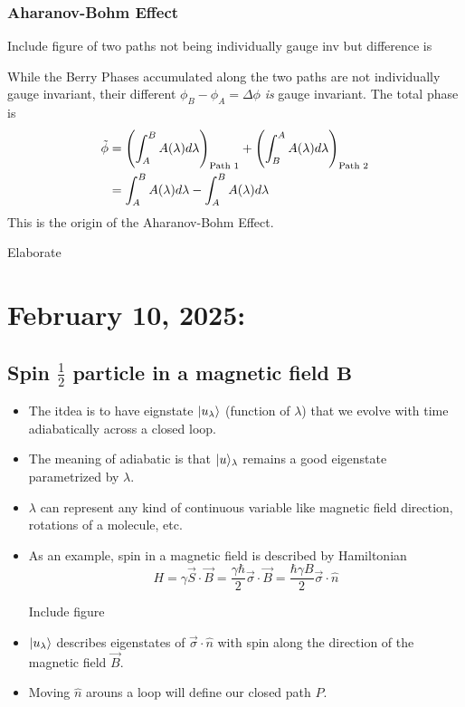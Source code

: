 \documentclass[11pt]{article}
\begin{document}
\subsubsection*{Aharanov-Bohm Effect}
\begin{center}
  Include figure of two paths not being individually gauge inv but difference is
\end{center} While the Berry Phases accumulated along the two paths are not individually gauge invariant, their different $\phi_B - \phi_A = \Delta \phi$ \emph{is} gauge invariant. The total phase is 
\begin{align*}
  \Tilde{\phi} &= \left(\int_{A}^B A(\lambda) d\lambda\right)_{\text{Path 1}} +  \left(\int_{B}^A A(\lambda) d\lambda\right)_{\text{Path 2}}  \\
  &= \int_{A}^B A(\lambda) d\lambda - \int_{A}^B A(\lambda) d\lambda
\end{align*} This is the origin of the Aharanov-Bohm Effect. \begin{note}
  {Elaborate}
\end{note}

\pagebreak
\section{February 10, 2025:}

\subsection{Spin $\frac{1}{2}$ particle in a magnetic field $\mathbf{B}$}

\begin{itemize}
  \item The itdea is to have eignstate $\lvert u_{\lambda}\rangle$ (function of $\lambda$) that we evolve with time adiabatically across a closed loop.
  \item The meaning of adiabatic is that $\lvert u\rangle_{\lambda}$ remains a good eigenstate parametrized by $\lambda$.
  \item $\lambda$ can represent any kind of continuous variable like magnetic field direction, rotations of a molecule, etc.
  \item As an example, spin in a magnetic field is described by Hamiltonian $$ H = \gamma \vec{S} \cdot \vec{B} = \frac{\gamma \hbar}{2} \vec{\sigma} \cdot \vec{B} = \frac{\hbar \gamma B}{2} \vec{\sigma} \cdot \hat{n} $$
  \begin{center}
    Include figure
  \end{center}
  \item $\lvert u_{\lambda}\rangle$ describes eigenstates of $\vec{\sigma} \cdot \hat{n}$ with spin along the direction of the magnetic field $\vec{B}$.
  \item Moving $\hat{n}$ arouns a loop will define our closed path $P$.
\end{itemize}
\end{document}
